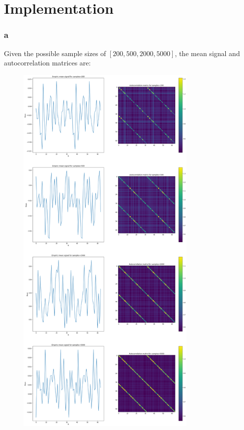 \documentclass[a4paper]{article}
\begin{document}
\part{Implementation}

\section*{a}

Given the possible sample sizes of $[200, 500, 2000, 5000]$, the mean signal and autocorrelation matrices are:

\begin{figure}[h]
    \centering
    \includegraphics[width=0.78\textwidth,height=0.78\textheight,keepaspectratio]{p2q1a.png}
\end{figure}
\end{document}
